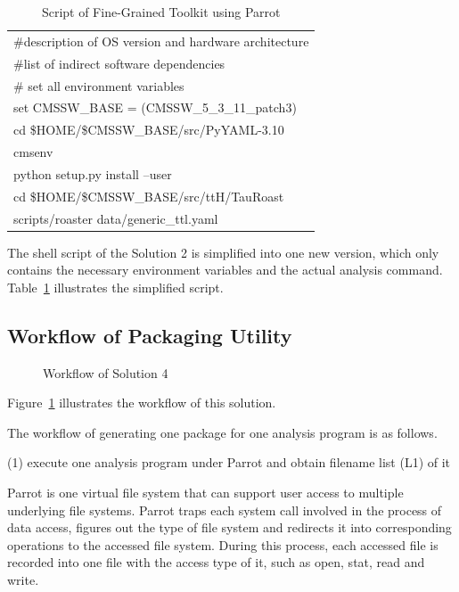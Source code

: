 \documentclass{acm_proc_article-sp}
\begin{document}
\begin{table}
    \centering
    \begin{tabular}{|l|}
        \hline
        \#description of OS version and hardware architecture \\
        \#list of indirect software dependencies \\
        \# set all environment variables\\
        set CMSSW\_BASE = (CMSSW\_5\_3\_11\_patch3) \\
        cd \$HOME/\$CMSSW\_BASE/src/PyYAML-3.10\\
        cmsenv \\
        python setup.py install --user \\
        cd \$HOME/\$CMSSW\_BASE/src/ttH/TauRoast\\
        scripts/roaster data/generic\_ttl.yaml \\
        \hline
    \end{tabular}
    \caption{Script of Fine-Grained Toolkit using Parrot}
    \label{table:parrot-script}
\end{table}

The shell script of the Solution 2 is simplified into one new version, which
only contains the necessary environment variables and the
actual analysis command. Table~\ref{table:parrot-script} illustrates
the simplified script.

\subsection{Workflow of Packaging Utility}
\begin{figure}
\centering
{}
\caption{Workflow of Solution 4}
\label{fig:workflow-parrot}
\end{figure}

Figure~\ref{fig:workflow-parrot} illustrates the workflow of this solution.

The workflow of generating one package for one analysis program is as follows.

(1) execute one analysis program under Parrot and obtain filename list (L1) of it

Parrot is one virtual file system that can support user access to multiple underlying file systems. Parrot traps each system call involved in the process of data access, figures out the type of file system and redirects it into corresponding operations to the accessed file system. During this process, each accessed file is recorded into one file with the access type of it, such as open, stat, read and write.
\end{document}
